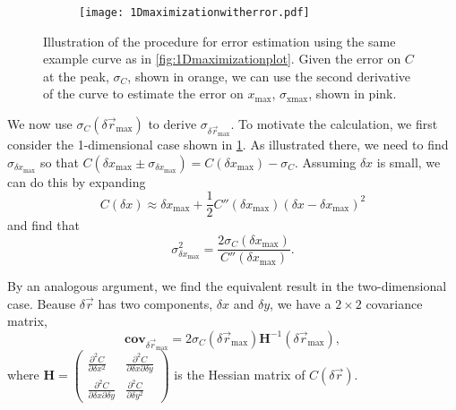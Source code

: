 \documentclass{article}
\newcommand{\matrixbold}[1]{\mathbf{#1}}
\begin{document}
\begin{figure}[ht]
	\centering
	\begin{subfigure}{0.45\linewidth}
		\texttt{[image: 1Dmaximizationwitherror.pdf]}
	\end{subfigure}
	\caption{Illustration of the procedure for error estimation using the same example curve as in \cref{fig:1Dmaximizationplot}.  Given the error on $C$ at the peak, $\sigma_C$, shown in orange, we can use the second derivative of the curve to estimate the error on $x_\text{max}$, $\sigma_\text{xmax}$, shown in pink.}
	\label{fig:1Dmaximizationploterror}
\end{figure}

We now use $\sigma_C(\delta\vec{r}_\text{max})$ to derive $\sigma_{\delta\vec{r}_\text{max}}$.  To motivate the calculation, we first consider the 1-dimensional case shown in \cref{fig:1Dmaximizationploterror}.  As illustrated there, we need to find $\sigma_{\delta x_\text{max}}$ so that $C(\delta x_\text{max}\pm\sigma_{\delta x_\text{max}})=C(\delta x_\text{max})-\sigma_C$.  Assuming $\delta x$ is small, we can do this by expanding
\begin{equation}
C(\delta x)\approx\delta x_\text{max} + \frac{1}{2}C''(\delta x_\text{max})(\delta x - \delta x_\text{max})^2
\end{equation}
and find that
\begin{equation}
\sigma_{\delta x_\text{max}}^2=\frac{2\sigma_C(\delta x_\text{max})}{C''(\delta x_\text{max})}.
\end{equation}

By an analogous argument, we find the equivalent result in the two-dimensional case.  Beause $\delta\vec{r}$ has two components, $\delta x$ and $\delta y$, we have a $2\times2$ covariance matrix,
\begin{equation}
\matrixbold{cov}_{\delta\vec{r}_\text{max}}=2\sigma_C(\delta\vec{r}_\text{max})\matrixbold{H}^{-1}(\delta\vec{r}_\text{max}),
\end{equation}
where $ %
\matrixbold{H}=\begin{pmatrix}
\frac{\partial^2C}{\partial \delta x^2} & \frac{\partial^2C}{\partial \delta x \partial \delta y} \\
\frac{\partial^2C}{\partial \delta x \partial \delta y} & \frac{\partial^2C}{\partial \delta y^2}
\end{pmatrix}
$ %
is the Hessian matrix of $C(\delta\vec{r})$.
\end{document}
